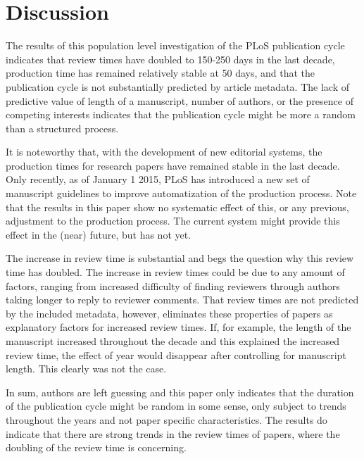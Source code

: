 \section*{Discussion}
The results of this population level investigation of the PLoS publication cycle indicates that review times have doubled to 150-250 days in the last decade, production time has remained relatively stable at 50 days, and that the publication cycle is not substantially predicted by article metadata. The lack of predictive value of length of a manuscript, number of authors, or the presence of competing interests indicates that the publication cycle might be more a random than a structured process. 

It is noteworthy that, with the development of new editorial systems, the production times for research papers have remained stable in the last decade. Only recently, as of January 1 2015, PLoS has introduced a new set of manuscript guidelines to improve automatization of the production process. Note that the results in this paper show no systematic effect of this, or any previous, adjustment to the production process. The current system might provide this effect in the (near) future, but has not yet.

The increase in review time is substantial and begs the question why this review time has doubled. The increase in review times could be due to any amount of factors, ranging from increased difficulty of finding reviewers through authors taking longer to reply to reviewer comments. That review times are not predicted by the included metadata, however, eliminates these properties of papers as explanatory factors for increased review times. If, for example, the length of the manuscript increased throughout the decade and this explained the increased review time, the effect of year would disappear after controlling for manuscript length. This clearly was not the case.

In sum, authors are left guessing and this paper only indicates that the duration of the publication cycle might be random in some sense, only subject to trends throughout the years and not paper specific characteristics. The results do indicate that there are strong trends in the review times of papers, where the doubling of the review time is concerning.
  